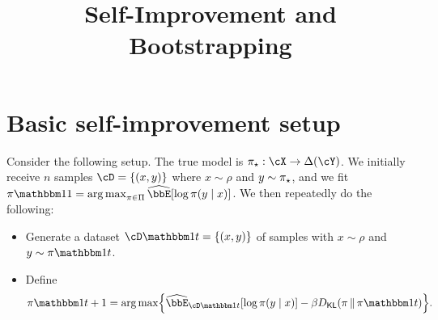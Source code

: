 \documentclass{article}
\title{Self-Improvement and Bootstrapping}
\author{%
%
}
\date{}
\begin{document}
\maketitle

\tableofcontents

\section{Basic self-improvement setup}
Consider the following setup. The true model is $\pistar:\cX\to\Delta(\cY)$. We
initially receive $n$ samples $\cD=\crl*{(x,y)}$ where $x\sim\rho$ and
$y\sim\pi_{\star}$, and we fit $\pi\ind{1}
=\argmax_{\pi\in\Pi}\Eh\brk*{\log\pi(y\mid{}x)}$. We then repeatedly
do the following:
\begin{itemize}
\item Generate a dataset $\cD\ind{t}=\crl*{(x,y)}$ of samples with
  $x\sim\rho$ and $y\sim\pi\ind{t}$.
\item Define
  \begin{align}
    \label{eq:self_training}
    \pi\ind{t+1}=\argmax\crl*{
      \Eh_{\cD\ind{t}}\brk*{\log\pi(y\mid{}x)}
      -\beta\Dkl{\pi}{\pi\ind{t}}
      }.
  \end{align}
\end{itemize}
\end{document}
